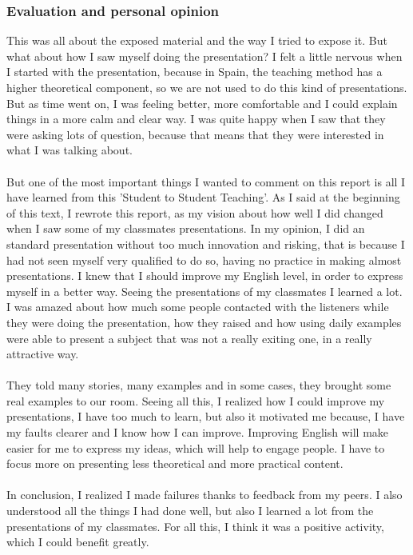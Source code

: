 \subsubsection{Evaluation and personal opinion}
This was all about the exposed material and the way I tried to expose it. But what about how I saw myself doing the presentation? I felt a little nervous when I started with the presentation, because in Spain, the teaching method has a higher theoretical component, so we are not used to do this kind of presentations. But as time went on, I was feeling better, more comfortable and I could explain things in a more calm and clear way. I was quite happy when I saw that they were asking lots of question, because that means that they were interested in what I was talking about.\\\\
But one of the most important things I wanted to comment on this report is all I have learned from this 'Student to Student Teaching'. As I said at the beginning of this text, I rewrote this report, as my vision about how well I did changed when I saw some of my classmates presentations. In my opinion, I did an standard presentation without too much innovation and risking, that is because I had not seen myself very qualified to do so, having no practice in making almost presentations. I knew that I should improve my English level, in order to express myself in a better way. Seeing the presentations of my classmates I learned a lot. I was amazed about how much some people contacted with the listeners while they were doing the presentation, how they raised and how using daily examples were able to present a subject that was not a really exiting one, in a really attractive way.\\\\
They told many stories, many examples and in some cases, they brought some real examples to our room. Seeing all this, I realized how I could improve my presentations, I have too much to learn, but also it motivated me because, I have my faults clearer and I know how I can improve. Improving English will make easier for me to express my ideas, which will help to engage people. I have to focus more on presenting less theoretical and more practical content.\\\\
In conclusion, I realized I made failures thanks to feedback from my peers. I also understood all the things I had done well, but also I learned a lot from the presentations of my classmates. For all this, I think it was a positive activity, which I could benefit greatly.
